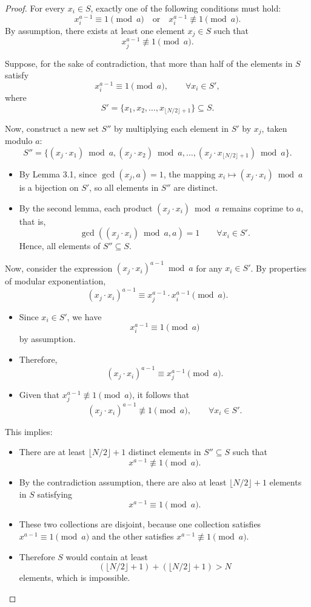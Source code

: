 \documentclass[12pt,a4paper]{report}
\begin{document}
\begin{proof}
For every \(x_i\in S\), exactly one of the following conditions must hold:
\[
x_i^{a-1}\equiv 1 \pmod a
\quad \text{or} \quad
x_i^{a-1}\not\equiv 1 \pmod a.
\]
By assumption, there exists at least one element \(x_j\in S\) such that
\[
x_j^{a-1}\not\equiv 1 \pmod a.
\]

Suppose, for the sake of contradiction, that more than half of the elements in \(S\) satisfy
\[
x_i^{a-1}\equiv 1 \pmod a,
\qquad \forall x_i\in S',
\]
where
\[
S'=\{x_1,x_2,\dots,x_{\lfloor N/2\rfloor+1}\}\subseteq S.
\]

Now, construct a new set \(S''\) by multiplying each element in \(S'\) by \(x_j\), taken modulo \(a\):
\[
S''=\{(x_j\cdot x_1)\bmod a,(x_j\cdot x_2)\bmod a,\dots,(x_j\cdot x_{\lfloor N/2\rfloor+1})\bmod a\}.
\]

\begin{itemize}
    \item By Lemma 3.1, since \(\gcd(x_j,a)=1\), the mapping \(x_i\mapsto (x_j\cdot x_i)\bmod a\) is a bijection on \(S'\), so all elements in \(S''\) are distinct.
    \item By the second lemma, each product \((x_j\cdot x_i)\bmod a\) remains coprime to \(a\), that is,
    \[
    \gcd((x_j\cdot x_i)\bmod a,a)=1
    \qquad
    \forall x_i\in S'.
    \]
    Hence, all elements of \(S''\subseteq S\).
\end{itemize}

Now, consider the expression \((x_j\cdot x_i)^{a-1}\bmod a\) for any \(x_i\in S'\). By properties of modular exponentiation,
\[
(x_j\cdot x_i)^{a-1}\equiv x_j^{a-1}\cdot x_i^{a-1}\pmod a.
\]

\begin{itemize}
    \item Since \(x_i\in S'\), we have
    \[
    x_i^{a-1}\equiv 1 \pmod a
    \]
    by assumption.
    \item Therefore,
    \[
    (x_j\cdot x_i)^{a-1}\equiv x_j^{a-1}\pmod a.
    \]
    \item Given that \(x_j^{a-1}\not\equiv 1 \pmod a\), it follows that
    \[
    (x_j\cdot x_i)^{a-1}\not\equiv 1 \pmod a,
    \qquad
    \forall x_i\in S'.
    \]
\end{itemize}

This implies:
\begin{itemize}
    \item There are at least \(\lfloor N/2\rfloor+1\) distinct elements in \(S''\subseteq S\) such that
    \[
    x^{a-1}\not\equiv 1 \pmod a.
    \]
    \item By the contradiction assumption, there are also at least \(\lfloor N/2\rfloor+1\) elements in \(S\) satisfying
    \[
    x^{a-1}\equiv 1 \pmod a.
    \]
    \item These two collections are disjoint, because one collection satisfies \(x^{a-1}\equiv 1 \pmod a\) and the other satisfies \(x^{a-1}\not\equiv 1 \pmod a\).
    \item Therefore \(S\) would contain at least
    \[
    (\lfloor N/2\rfloor+1)+(\lfloor N/2\rfloor+1)>N
    \]
    elements, which is impossible.
\end{itemize}


\end{proof}
\end{document}
